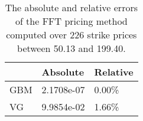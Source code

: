 \begin{table}[h]
\centering
\caption{The absolute and relative errors of the FFT pricing method           computed over 226 strike prices between 50.13 and 199.40.}
\label{tab:err_table}
\begin{tabular}{lll}
\hline
\hline
{} &    \textbf{Absolute} & \textbf{Relative} \\
\hline
GBM &  2.1708e-07 &    0.00\% \\
VG  &  9.9854e-02 &    1.66\% \\
\hline
\end{tabular}
\end{table}
